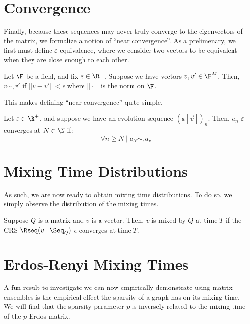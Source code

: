 \section{Convergence}

Finally, because these sequences may never truly converge to the eigenvectors of the matrix, we formalize a notion of ``near convergence''.
As a prelimenary, we first must define $\varepsilon$-equivalence, where we consider two vectors to be equivalent when they are close enough to each other.

\begin{definition}
Let $\F$ be a field, and fix $\varepsilon \in \R^+$. Suppose we have vectors $v, v' \in \F^M$.
Then, $v \sim_\epsilon v'$ if $||v - v'|| < \epsilon$ where $|| \cdot ||$ is the norm on $\F$.
\end{definition}

This makes defining ``near convergence'' quite simple.

\begin{definition}
Let $\varepsilon \in \R^+$, and suppose we have an evolution sequence $(a[\vec{v}])_n$. Then, $a_n$ $\varepsilon$-converges at $N \in \N$ if:
$$\forall n \geq N \mid  a_N \sim_\epsilon a_n$$
\end{definition}

\newpage

\section{Mixing Time Distributions}

As such, we are now ready to obtain mixing time distributions. To do so, we simply observe the distribution of the mixing times.

\begin{definition}
Suppose $Q$ is a matrix and $v$ is a vector. Then, $v$ is mixed by $Q$ at time $T$ if the CRS $\Rseq(v \mid \Seq_Q)$ $\epsilon$-converges at time $T$.
\end{definition}

\section{Erdos-Renyi Mixing Times}

A fun result to investigate we can now empirically demonstrate using matrix ensembles is the empirical effect the sparsity of a graph has on its mixing time.
We will find that the sparsity parameter $p$ is inversely related to the mixing time of the $p$-Erdos matrix.

